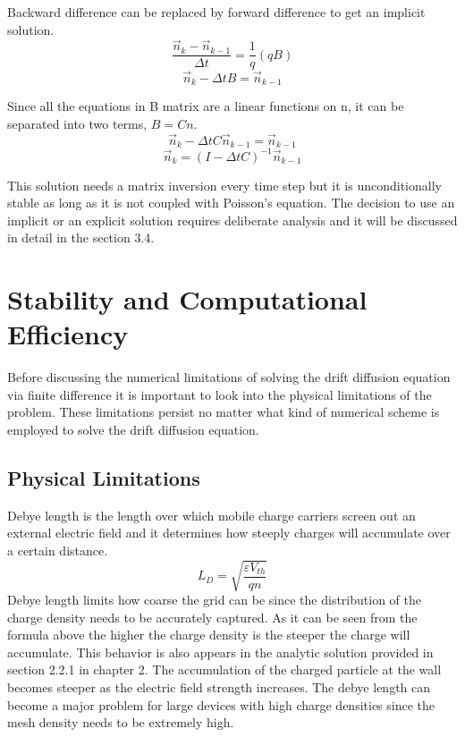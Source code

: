 \begin{doublespace}
Backward difference can be replaced by forward difference to get an implicit solution.
\begin{equation}\nonumber
\frac{ \vec{n}_{k}-\vec{n}_{k-1}}{\Delta t}=\frac{1}{q}(qB)
\end{equation}
\begin{equation}\nonumber
\vec{n}_{k}-\Delta t B =\vec{n}_{k-1}
\end{equation}

Since all the equations in B matrix are a linear functions on n, it can be separated into two terms, $B=Cn$.
\begin{equation}\nonumber
\vec{n}_{k}-\Delta t C\vec{n}_{k-1} =\vec{n}_{k-1}
\end{equation}
\begin{equation}
\vec{n}_k=(I-\Delta t C)^{-1}\vec{n}_{k-1}
\end{equation}

This solution needs a matrix inversion every time step but it is unconditionally stable\cite{Dragica1} as long as it is not coupled with Poisson's equation. The decision to use an implicit or an explicit solution requires deliberate analysis and it will be discussed in detail in the section 3.4.
\clearpage

\section{Stability and Computational Efficiency}
Before discussing  the numerical limitations of solving the drift diffusion equation via finite difference it is important to look into the physical limitations of the problem. These limitations persist no matter what kind of numerical scheme is employed to solve the drift diffusion equation.

\subsection{Physical Limitations}
Debye length is the length over which mobile charge carriers screen out an external electric field and it determines how steeply charges will accumulate over a certain distance.
\begin{equation}
L_D=\sqrt{\frac{\varepsilon V_{th}}{q n}}
\label{debye}
\end{equation}
Debye length limits how coarse the grid can be since the distribution of the charge density needs to be accurately captured. As it can be seen from the formula above the higher the charge density is the steeper the charge will accumulate. This behavior is also appears in the analytic solution provided in section 2.2.1 in chapter 2. The accumulation of the charged particle at the wall becomes steeper as the electric field strength increases. The debye length can become a major problem for large devices with high charge densities since the mesh density needs to be extremely high.


\end{doublespace}
